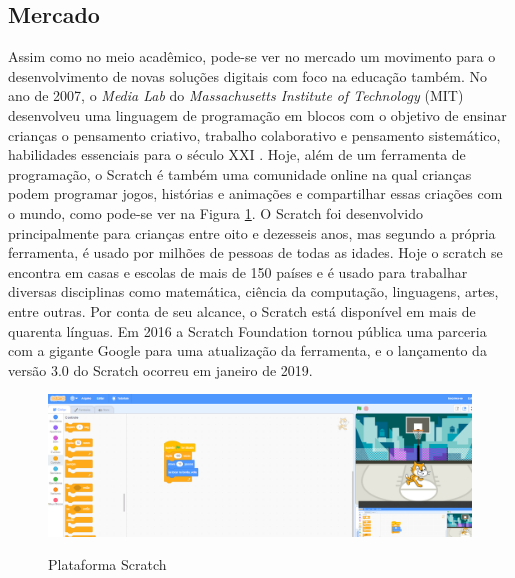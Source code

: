 \subsection{Mercado}
Assim como no meio acadêmico, pode-se ver no mercado um movimento para o desenvolvimento de novas soluções digitais com foco na educação também. 
No ano de 2007, o \textit{Media Lab} do \textit{Massachusetts Institute of Technology} (MIT) desenvolveu uma linguagem de programação em blocos com o objetivo de ensinar crianças o pensamento criativo, trabalho colaborativo e pensamento sistemático, habilidades essenciais para o século XXI \cite{about_scratch}. Hoje, além de um ferramenta de programação, o Scratch é também uma comunidade online na qual crianças podem programar jogos, histórias e animações e compartilhar essas criações com o mundo, como pode-se ver na Figura \ref{figura:scratch}. O Scratch foi desenvolvido principalmente para crianças entre oito e dezesseis anos, mas segundo a própria ferramenta, é usado por milhões de pessoas de todas as idades. Hoje o scratch se encontra em casas e escolas de mais de 150 países e é usado para trabalhar diversas disciplinas como matemática, ciência da computação, linguagens, artes, entre outras. Por conta de seu alcance, o Scratch está disponível em mais de quarenta línguas. Em 2016 a Scratch Foundation tornou pública uma parceria com a gigante Google para uma atualização da ferramenta, e o lançamento da versão 3.0 do Scratch ocorreu em janeiro de 2019.

\begin{figure}[H]
    \caption{Plataforma Scratch}
    \centering
        \includegraphics[width=\linewidth]{Imagens/cap2/scratch.png}
    \label{figura:scratch}
\end{figure}

